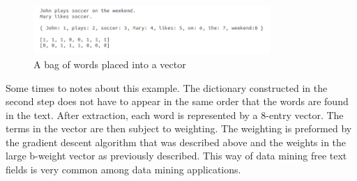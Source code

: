 \begin{figure}[h!]
\centering
\includegraphics[width=0.8\textwidth]{images/bow}
\caption{A bag of words placed into a vector\label{fig:bow}}
\end{figure}

Some times to notes about this example. The dictionary constructed in the second step does not have to appear in the same order
that the words are found in the text. After extraction, each word is represented by a 8-entry vector. The terms in the vector
are then subject to weighting. The weighting is preformed by the gradient descent algorithm that was described above and the
weights in the large b-weight vector as previously described. This way of data mining free text fields is very common among
data mining applications.\\

